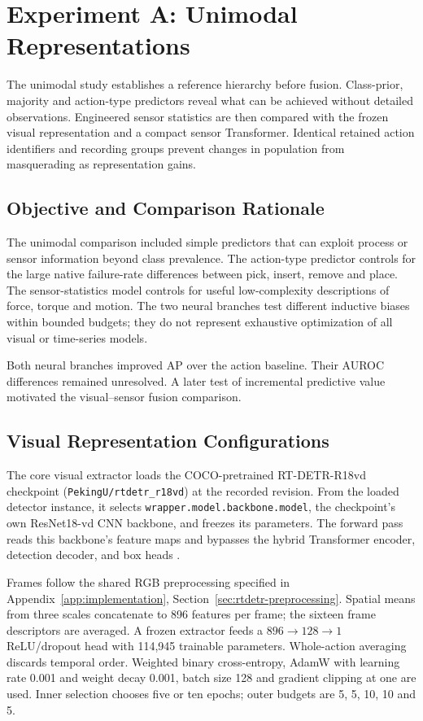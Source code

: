 \section{Experiment A: Unimodal Representations}
The unimodal study establishes a reference hierarchy before fusion. Class-prior,
majority and action-type predictors reveal what can be achieved without detailed
observations. Engineered sensor statistics are then compared with the frozen visual
representation and a compact sensor Transformer. Identical retained action identifiers
and recording groups prevent changes in population from masquerading as representation
gains.

\subsection{Objective and Comparison Rationale}
The unimodal comparison included simple predictors that can exploit process or sensor
information beyond class prevalence. The action-type predictor controls for the large
native failure-rate differences between pick, insert, remove and place. The
sensor-statistics model controls for useful low-complexity descriptions of force, torque
and motion. The two neural branches test different inductive biases within bounded
budgets; they do not represent exhaustive optimization of all visual or time-series
models.

Both neural branches improved AP over the action baseline. Their AUROC differences
remained unresolved. A later test of incremental predictive value motivated the
visual--sensor fusion comparison.

\subsection{Visual Representation Configurations}
The core visual extractor loads the COCO-pretrained RT-DETR-R18vd checkpoint
(\texttt{PekingU/rtdetr\_r18vd}) at the recorded revision. From the loaded detector
instance, it selects \nolinkurl{wrapper.model.backbone.model}, the checkpoint's own
ResNet18-vd CNN backbone, and freezes its parameters. The forward pass reads this
backbone's feature maps and bypasses the hybrid Transformer encoder, detection decoder,
and box heads \parencite{Zhao2024RTDETR}.

Frames follow the shared RGB preprocessing specified in
Appendix~\ref{app:implementation}, Section~\ref{sec:rtdetr-preprocessing}. Spatial means
from three scales concatenate to 896 features per frame; the sixteen frame descriptors
are averaged. A frozen extractor feeds a $896\rightarrow128\rightarrow1$ ReLU/dropout
head with 114,945 trainable parameters. Whole-action averaging discards temporal order.
Weighted binary cross-entropy, AdamW with learning rate 0.001 and weight decay 0.001,
batch size 128 and gradient clipping at one are used. Inner selection chooses five or
ten epochs; outer budgets are 5, 5, 10, 10 and 5.

